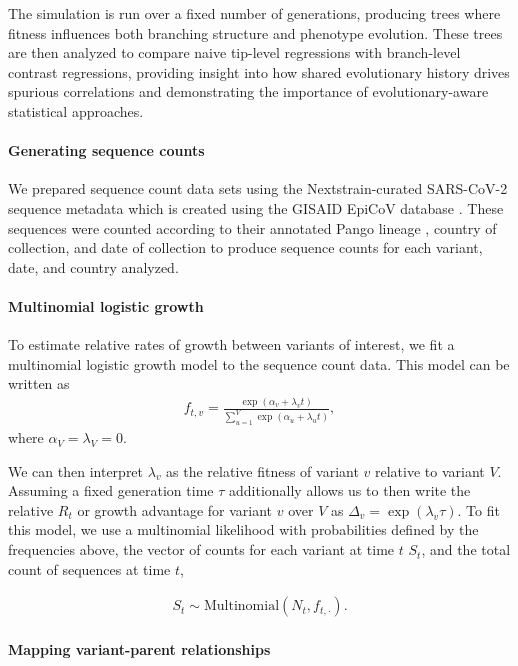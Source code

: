 The simulation is run over a fixed number of generations, producing trees where fitness influences both branching structure and phenotype evolution.
These trees are then analyzed to compare naive tip-level regressions with branch-level contrast regressions, providing insight into how shared evolutionary history drives spurious correlations and demonstrating the importance of evolutionary-aware statistical approaches.

\paragraph{Generating sequence counts}%

We prepared sequence count data sets using the Nextstrain-curated SARS-CoV-2 sequence metadata \cite{Hadfield2018} which is created using the GISAID EpiCoV database \cite{khare2021gisaid}.
These sequences were counted according to their annotated Pango lineage \cite{aksamentov2021nextclade}, country of collection, and date of collection to produce sequence counts for each variant, date, and country analyzed.

\paragraph{Multinomial logistic growth}

To estimate relative rates of growth between variants of interest, we fit a multinomial logistic growth model to the sequence count data.
This model can be written as
\begin{align}
    f_{t, v} = \frac{\exp(\alpha_{v} + \lambda_{v} t)}{\sum_{u=1}^{V} \exp(\alpha_{u} + \lambda_{u} t)},
\end{align}
where $\alpha_{V} = \lambda_{V} = 0$.

We can then interpret $\lambda_{v}$ as the relative fitness of variant $v$ relative to variant $V$.
Assuming a fixed generation time $\tau$ additionally allows us to then write the relative $R_{t}$ or growth advantage for variant $v$ over $V$ as $\Delta_{v} = \exp(\lambda_{v}\tau)$.
To fit this model, we use a multinomial likelihood with probabilities defined by the frequencies above, the vector of counts for each variant at time $t$ $S_{t}$, and the total count of sequences at time $t$,

\begin{align}
    S_{t} \sim \text{Multinomial}(N_{t}, f_{t, \cdot}).
\end{align}

\paragraph{Mapping variant-parent relationships}%

